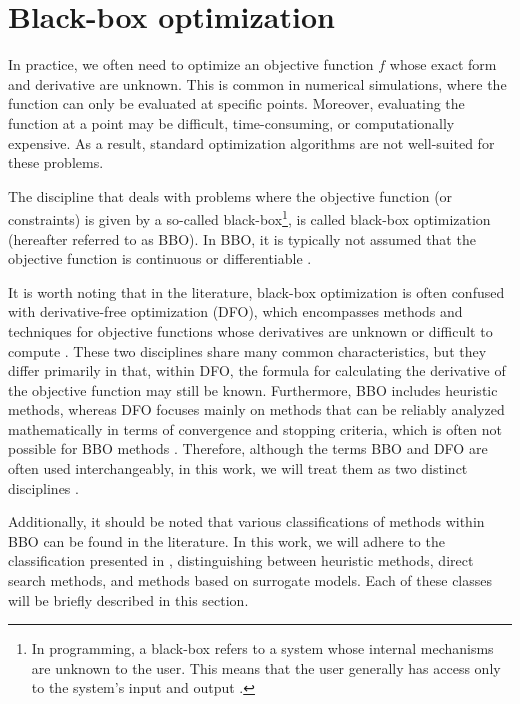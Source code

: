 \section{Black-box optimization}\label{black-box}
In practice, we often need to optimize an objective function $f$ whose exact form and derivative are unknown. This is common in numerical simulations, where the function can only be evaluated at specific points. Moreover, evaluating the function at a point may be difficult, time-consuming, or computationally expensive. As a result, standard optimization algorithms are not well-suited for these problems.

The discipline that deals with problems where the objective function (or constraints) is given by a so-called black-box\footnote{In programming, a black-box refers to a system whose internal mechanisms are unknown to the user. This means that the user generally has access only to the system’s input and output \cite{BBO-textbook}.}, is called black-box optimization (hereafter referred to as BBO). In BBO, it is typically not assumed that the objective function is continuous or differentiable \cite{BBO-textbook, derivative-free-review, two-decades}.

It is worth noting that in the literature, black-box optimization is often confused with derivative-free optimization (DFO), which encompasses methods and techniques for objective functions whose derivatives are unknown or difficult to compute \cite{BBO-textbook, derivative-free-review, Kramer2011}. These two disciplines share many common characteristics, but they differ primarily in that, within DFO, the formula for calculating the derivative of the objective function may still be known. Furthermore, BBO includes heuristic methods, whereas DFO focuses mainly on methods that can be reliably analyzed mathematically in terms of convergence and stopping criteria, which is often not possible for BBO methods \cite{BBO-textbook}. Therefore, although the terms BBO and DFO are often used interchangeably, in this work, we will treat them as two distinct disciplines \cite{BBO-textbook}.

Additionally, it should be noted that various classifications of methods within BBO can be found in the literature. In this work, we will adhere to the classification presented in \cite{BBO-textbook}, distinguishing between heuristic methods, direct search methods, and methods based on surrogate models. Each of these classes will be briefly described in this section.




